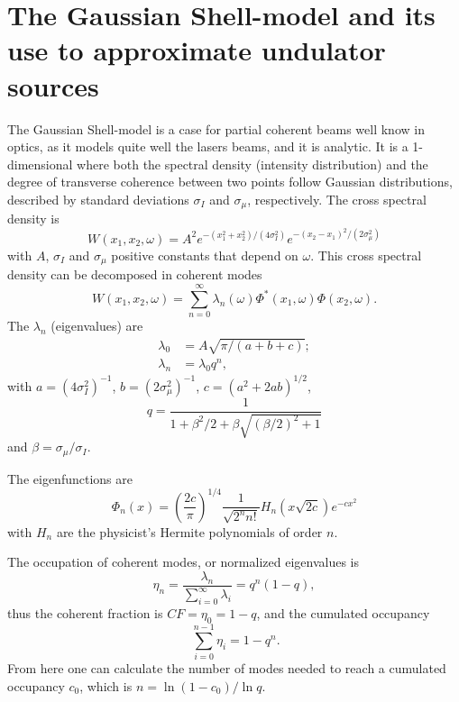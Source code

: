 \documentclass{iucr}              %
\begin{document}
\section{The Gaussian Shell-model and its use to approximate undulator sources}
\label{sec:appendixA}
The Gaussian Shell-model is a case for partial coherent beams well know in optics, as it models quite well the lasers beams, and it is analytic. It is a 1-dimensional where both the spectral density (intensity distribution) and the degree of transverse coherence between two points follow Gaussian distributions, described by standard deviations $\sigma_I$ and $\sigma_{\mu}$, respectively. The cross spectral density is
\begin{equation}
W(x_1,x_2,\omega) = A^2 e^{-(x_1^2+x_2^2)/(4 \sigma_I^2)} e^{-(x_2-x_1)^2/(2 \sigma_{\mu}^2)}
\label{GS_CSD}
\end{equation}
with $A$, $\sigma_I$ and $\sigma_{\mu}$ positive constants that depend on $\omega$.
This cross spectral density can be decomposed in coherent modes
\cite{Starikov82,mandel_wolf} 
\begin{equation}
W(x_1,x_2,\omega) = \sum_{n=0}^{\infty} \lambda_n(\omega) \Phi^*(x_1,\omega) \Phi(x_2,\omega). 
\label{CMD}
\end{equation}
The $\lambda_n$ (eigenvalues) are
\begin{align}
\lambda_0 &= A \sqrt{\pi/( a+b+c)}; \\ 
\lambda_n &= \lambda_0 q ^n,
\end{align}
with $a = (4 \sigma_I^2)^{-1}$, $ 
b = (2 \sigma_{\mu}^2)^{-1}$, $ 
c = (a^2 + 2 a b)^{1/2}$,
\begin{equation}
q = \frac{1}{1 + \beta^2/2 + \beta\sqrt{(\beta/2)^2+1}} 
\label{q}
\end{equation}
and $\beta=\sigma_{\mu}/\sigma_I$. 

The eigenfunctions are
\begin{equation}
\Phi_n(x) = \left( \frac{2c}{\pi} \right)^{1/4} \frac{1}{\sqrt{2^n n!}} H_n(x\sqrt{2c})e^{-cx^2}
\label{GSeigenvalues}
\end{equation}
with $H_n$ are the physicist's Hermite polynomials of order $n$. 

The occupation of coherent modes, or normalized eigenvalues is   
\begin{equation}
\eta_n = \frac{\lambda_n}{\sum_{i=0}^{\infty} \lambda_i} = q^n(1-q), 
\end{equation}
thus the coherent fraction is $CF=\eta_0=1-q$, and the cumulated occupancy
\begin{equation}
\ \sum_{i=0}^{n-1} \eta_i = 1-q^n. 
\end{equation}
From here one can calculate the number of modes needed to reach a cumulated occupancy $c_0$, which is $n=\ln(1-c_0)/\ln q$.
\end{document}

